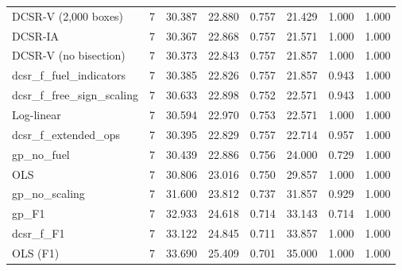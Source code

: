 \begin{tabular}{lrrrrrrr}
DCSR-V (2,000 boxes) & 7 & 30.387 & 22.880 & 0.757 & 21.429 & 1.000 & 1.000 \\
DCSR-IA & 7 & 30.367 & 22.868 & 0.757 & 21.571 & 1.000 & 1.000 \\
DCSR-V (no bisection) & 7 & 30.373 & 22.843 & 0.757 & 21.857 & 1.000 & 1.000 \\
dcsr\_f\_fuel\_indicators & 7 & 30.385 & 22.826 & 0.757 & 21.857 & 0.943 & 1.000 \\
dcsr\_f\_free\_sign\_scaling & 7 & 30.633 & 22.898 & 0.752 & 22.571 & 0.943 & 1.000 \\
Log-linear & 7 & 30.594 & 22.970 & 0.753 & 22.571 & 1.000 & 1.000 \\
dcsr\_f\_extended\_ops & 7 & 30.395 & 22.829 & 0.757 & 22.714 & 0.957 & 1.000 \\
gp\_no\_fuel & 7 & 30.439 & 22.886 & 0.756 & 24.000 & 0.729 & 1.000 \\
OLS & 7 & 30.806 & 23.016 & 0.750 & 29.857 & 1.000 & 1.000 \\
gp\_no\_scaling & 7 & 31.600 & 23.812 & 0.737 & 31.857 & 0.929 & 1.000 \\
gp\_F1 & 7 & 32.933 & 24.618 & 0.714 & 33.143 & 0.714 & 1.000 \\
dcsr\_f\_F1 & 7 & 33.122 & 24.845 & 0.711 & 33.857 & 1.000 & 1.000 \\
OLS (F1) & 7 & 33.690 & 25.409 & 0.701 & 35.000 & 1.000 & 1.000 \\
\bottomrule
\end{tabular}
